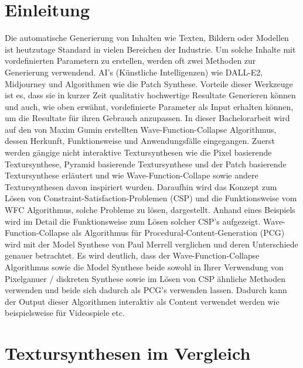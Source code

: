 \documentclass[12pt, a4paper,twoside,openright]{report} %
\begin{document}
\tableofcontents

\chapter{Einleitung}

Die automatische Generierung von Inhalten wie Texten, Bildern oder Modellen ist heutzutage Standard in vielen Bereichen der Industrie.
Um solche Inhalte mit vordefinierten Parametern zu erstellen, werden oft zwei Methoden zur Generierung verwendend.
AI's {(Künstliche Intelligenzen)} wie DALL-E2, Midjourney und Algorithmen wie die Patch Synthese.
Vorteile dieser Werkzeuge ist es, dass sie in kurzer Zeit qualitativ hochwertige Resultate Generieren können und auch, wie oben erwähnt,
vordefinierte Parameter als Input erhalten können, um die Resultate für ihren Gebrauch anzupassen.
In dieser Bachelorarbeit wird auf den von Maxim Gumin erstellten Wave-Function-Collapse Algorithmus, dessen Herkunft, Funktionsweise und Anwendungsfälle eingegangen.
Zuerst werden gängige nicht interaktive Textursynthesen wie die Pixel basierende Textursynthese, Pyramid basierende Textursynthese und der Patch basierende Textursynthese erläutert
und wie Wave-Function-Collape sowie andere Textursynthesen davon inspiriert wurden.
Daraufhin wird das Konzept zum Lösen von Constraint-Satisfaction-Problemen {(CSP)} und die Funktionsweise vom WFC Algorithmus, solche Probleme zu lösen, dargestellt.
Anhand eines Beispiels wird im Detail die Funktionsweise zum Lösen solcher CSP's aufgezeigt.
Wave-Function-Collapse als Algorithmus für Procedural-Content-Generation {(PCG)} wird mit der Model Synthese von Paul Merrell verglichen und deren Unterschiede genauer betrachtet.
Es wird deutlich, dass der Wave-Function-Collapse Algorithmus sowie die Model Synthese beide sowohl in Ihrer Verwendung von Pixelganuer / diskreten Synthese sowie im Lösen von
CSP ähnliche Methoden verwenden und beide sich dadurch als PCG's verwenden lassen.
Dadurch kann der Output dieser Algorithmen interaktiv als Content verwendet werden wie beispielsweise für Videospiele etc.

\chapter{Textursynthesen im Vergleich}
\end{document}
